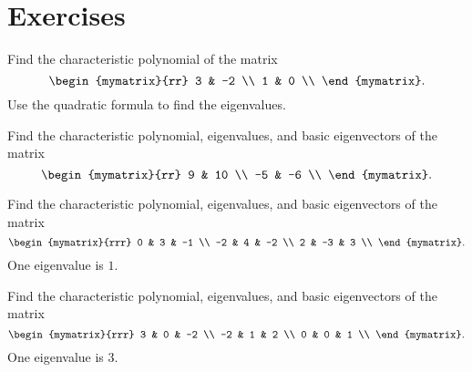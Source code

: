 \section*{Exercises}

\begin{ex}
  Find the characteristic polynomial of the matrix
  \begin{equation*}
    \begin{mymatrix}{rr}
      3 &  -2 \\
      1 &   0 \\
    \end{mymatrix}.
  \end{equation*}
  Use the quadratic formula to find the eigenvalues.
\end{ex}

\begin{ex}
  Find the characteristic polynomial, eigenvalues, and basic
  eigenvectors of the matrix
  \begin{equation*}
    \begin{mymatrix}{rr}
      9 &  10 \\
      -5 &  -6 \\
    \end{mymatrix}.
  \end{equation*}
\end{ex}

\begin{ex}
  Find the characteristic polynomial, eigenvalues, and basic
  eigenvectors of the matrix
  \begin{equation*}
    \begin{mymatrix}{rrr}
      0 &   3 &  -1 \\
      -2 &   4 &  -2 \\
      2 &  -3 &   3 \\
    \end{mymatrix}.
  \end{equation*}
  One eigenvalue is $1$.
\end{ex}

\begin{ex}
  Find the characteristic polynomial, eigenvalues, and basic
  eigenvectors of the matrix
  \begin{equation*}
    \begin{mymatrix}{rrr}
      3 &   0 &  -2 \\
      -2 &   1 &   2 \\
      0 &   0 &   1 \\
    \end{mymatrix}.
  \end{equation*}
  One eigenvalue is $3$.
\end{ex}

